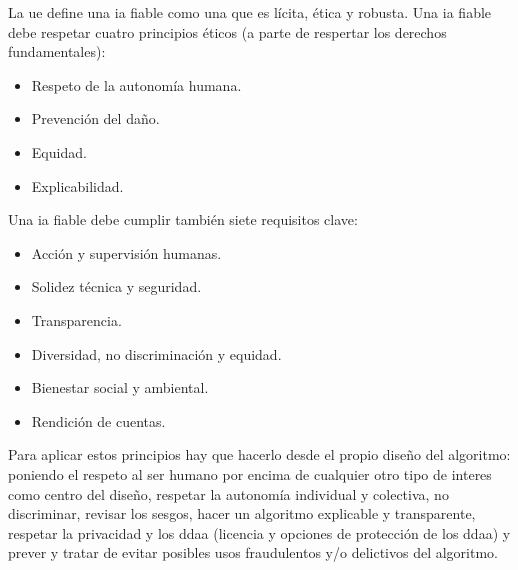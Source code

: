 La \gls{ue} define una \gls{ia} fiable como una que es lícita, ética y robusta.
Una \gls{ia} fiable debe respetar cuatro principios éticos (a parte de respertar los derechos fundamentales):
\begin{itemize}
    \item Respeto de la autonomía humana.
    \item Prevención del daño.
    \item Equidad.
    \item Explicabilidad.
\end{itemize}

Una \gls{ia} fiable debe cumplir también siete requisitos clave:
\begin{itemize}
    \item Acción y supervisión humanas.
    \item Solidez técnica y seguridad.
    \item Transparencia.
    \item Diversidad, no discriminación y equidad.
    \item Bienestar social y ambiental.
    \item Rendición de cuentas.
\end{itemize}

Para aplicar estos principios hay que hacerlo desde el propio diseño del algoritmo: poniendo el respeto al ser humano por encima de cualquier otro tipo de interes como centro del diseño, respetar la autonomía individual y colectiva, no discriminar, revisar los sesgos, hacer un algoritmo explicable y transparente, respetar la privacidad y los \gls{ddaa} (licencia y opciones de protección de los \gls{ddaa}) y prever y tratar de evitar posibles usos fraudulentos y/o delictivos del algoritmo.
